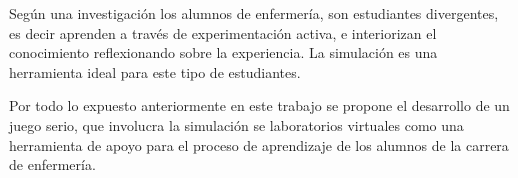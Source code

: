 Según una investigación los alumnos de enfermería, son estudiantes divergentes,
es decir aprenden a través de experimentación activa, e interiorizan el
conocimiento reflexionando sobre la experiencia. La simulación es una
herramienta ideal para este tipo de estudiantes\cite{humphreys2013developing}.

Por todo lo expuesto anteriormente en este trabajo se propone  el desarrollo de un 
juego serio, que involucra la simulación se laboratorios virtuales como una herramienta 
de apoyo para el proceso de aprendizaje de los alumnos de la carrera de enfermería.




